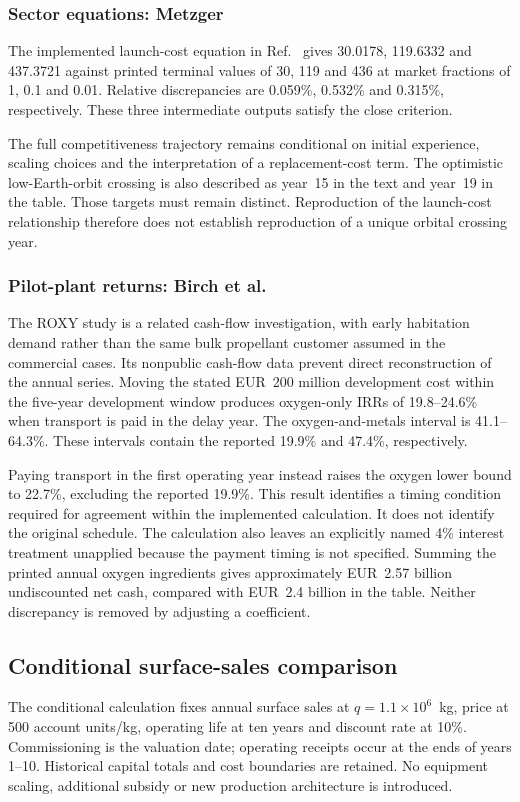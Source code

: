 \documentclass[final,5p,times,twocolumn]{elsarticle}
\begin{document}
\subsubsection{Sector equations: Metzger}
The implemented launch-cost equation in Ref.~\cite{metzger2023} gives 30.0178, 119.6332 and 437.3721 against printed terminal values of 30, 119 and 436 at market fractions of 1, 0.1 and 0.01. Relative discrepancies are 0.059\%, 0.532\% and 0.315\%, respectively. These three intermediate outputs satisfy the close criterion.

The full competitiveness trajectory remains conditional on initial experience, scaling choices and the interpretation of a replacement-cost term. The optimistic low-Earth-orbit crossing is also described as year~15 in the text and year~19 in the table. Those targets must remain distinct. Reproduction of the launch-cost relationship therefore does not establish reproduction of a unique orbital crossing year.

\subsubsection{Pilot-plant returns: Birch et al.}
The ROXY study \cite{birch2026} is a related cash-flow investigation, with early habitation demand rather than the same bulk propellant customer assumed in the commercial cases. Its nonpublic cash-flow data prevent direct reconstruction of the annual series. Moving the stated EUR~200 million development cost within the five-year development window produces oxygen-only IRRs of 19.8--24.6\% when transport is paid in the delay year. The oxygen-and-metals interval is 41.1--64.3\%. These intervals contain the reported 19.9\% and 47.4\%, respectively.

Paying transport in the first operating year instead raises the oxygen lower bound to 22.7\%, excluding the reported 19.9\%. This result identifies a timing condition required for agreement within the implemented calculation. It does not identify the original schedule. The calculation also leaves an explicitly named 4\% interest treatment unapplied because the payment timing is not specified. Summing the printed annual oxygen ingredients gives approximately EUR~2.57 billion undiscounted net cash, compared with EUR~2.4 billion in the table. Neither discrepancy is removed by adjusting a coefficient.

\subsection{Conditional surface-sales comparison}\label{sec:conditional}
The conditional calculation fixes annual surface sales at $q=1.1\times10^6$~kg, price at 500 account units/kg, operating life at ten years and discount rate at 10\%. Commissioning is the valuation date; operating receipts occur at the ends of years 1--10. Historical capital totals and cost boundaries are retained. No equipment scaling, additional subsidy or new production architecture is introduced.
\end{document}
